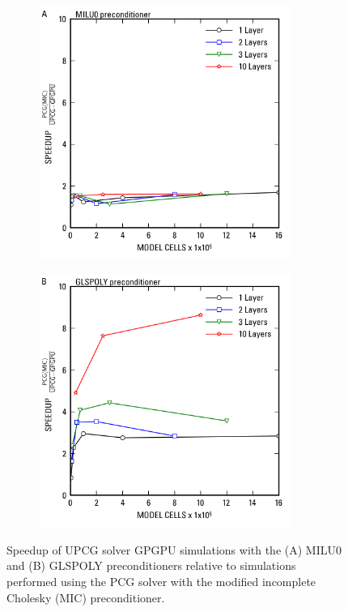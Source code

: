 \documentclass[12pt]{article}
\begin{document}
\newpage
\begin{figure}[hp]
	\begin{subfigure}[b]{0.5\textwidth}
		\centering
  		\includegraphics[width=8.25cm]{Figure5a.png}
	\end{subfigure}
	\begin{subfigure}[b]{0.5\textwidth}
		\centering
  		\includegraphics[width=8.25cm]{Figure5b.png}
	\end{subfigure}
 	\caption{Speedup of UPCG solver GPGPU simulations with the (A) MILU0 and (B) GLSPOLY preconditioners relative to simulations performed using the PCG solver with the modified incomplete Cholesky (MIC) preconditioner.}
	\label{FigGPUResults}
\end{figure}
\end{document}
